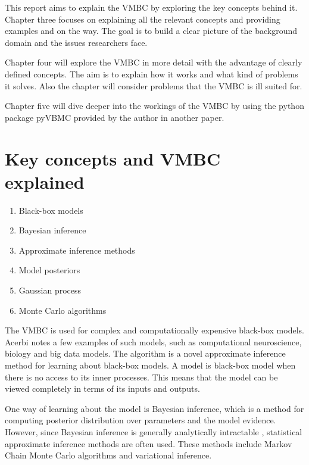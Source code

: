 \documentclass[english,oneside,openany]{UH_DS_report}
\begin{document}
This report aims to explain the VMBC by exploring the key concepts behind it. 
Chapter three focuses on explaining all the relevant concepts and providing examples 
and on the way. The goal is to build a clear picture of the background domain 
and the issues researchers face.

Chapter four will explore the VMBC in more detail with the advantage 
of clearly defined concepts. The aim is to explain how it works and 
what kind of problems it solves. Also the chapter will consider problems that 
the VMBC is ill suited for.

Chapter five will dive deeper into the workings of the 
VMBC by using the python package pyVBMC provided by the author in another paper. 

\chapter{Key concepts and VMBC explained}
\label{chapter:structure}
\begin{enumerate}
  \renewcommand{\labelenumi}{\roman{enumi}.}
  \item Black-box models
  \item Bayesian inference
  \item Approximate inference methods
  \item Model posteriors
  \item Gaussian process
  \item Monte Carlo algorithms
\end{enumerate}


The VMBC is used for complex and computationally expensive black-box models. 
Acerbi \cite{acerbi2018}\cite{acerbi2020}
notes a few examples of such models, such as computational neuroscience, biology and big data models.
The algorithm is a novel approximate inference  method for learning about black-box models. A model is black-box model when there is no access to its inner processes. This means that the 
model can be viewed completely in terms of its inputs and outputs. 

One way of learning about the model is Bayesian inference, which is a method for computing posterior distribution
over parameters and the model evidence. However, since Bayesian inference is 
generally analytically intractable \cite{acerbi2018}, statistical approximate inference methods 
are often used. These methods include Markov Chain Monte Carlo algorithms and variational inference.
\end{document}
